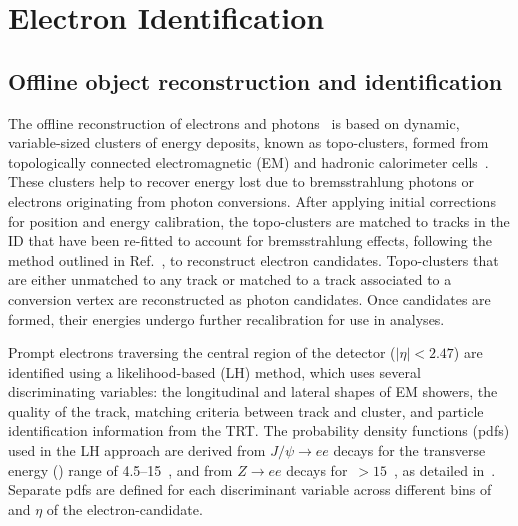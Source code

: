 \section{Electron Identification}\label{sec:electronID}
\subsection{Offline object reconstruction and identification}\label{subsec:electron_offline}


The offline reconstruction of electrons and photons~\cite{ATLAS-EGAM-2018-01} is based on dynamic, variable-sized clusters of energy deposits, known as topo-clusters, formed from topologically connected electromagnetic (EM) and hadronic calorimeter cells~\cite{PERF-2014-07}. These clusters help to recover
energy lost due to bremsstrahlung photons or electrons originating from photon conversions. After applying initial corrections for position and energy calibration, the topo-clusters are matched to tracks in the ID that have been re-fitted to account for bremsstrahlung effects,
following the method outlined in Ref.~\cite{ATLAS-CONF-2012-047}, to reconstruct electron candidates. Topo-clusters that are either unmatched to any track or matched to a track associated to a conversion vertex are reconstructed as photon candidates. Once candidates are formed, their energies undergo further recalibration for use in analyses.

Prompt electrons traversing the central region of the detector ($|\eta| < 2.47$) are identified using a likelihood-based (LH) method, which uses several discriminating variables: the longitudinal and lateral shapes of EM showers, the quality of the track, matching criteria between track and cluster,
and particle identification information from the TRT. The probability density functions (pdfs) used in the LH approach are derived from $J/\psi\rightarrow ee$ decays for the transverse energy (\et{}) range of 4.5--15~\GeV{}, and from $Z\rightarrow ee$ decays for \et$\,>15$~\GeV{}, as detailed in~\cite{ATLAS-EGAM-2018-01}. Separate pdfs are defined for each discriminant variable across different bins of \et{} and $\eta$ of the electron-candidate.


